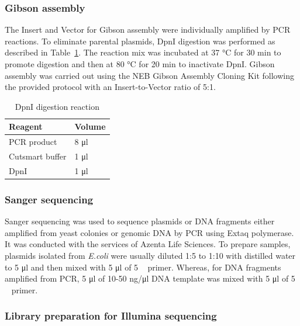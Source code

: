 \subsubsection{Gibson assembly}

The Insert and Vector for Gibson assembly were individually amplified by PCR reactions. To eliminate parental plasmids, DpnI digestion was performed as described in Table~\ref{tab:DpnI}. The reaction mix was incubated at 37 \si{\celsius} for 30 \si{\minute} to promote digestion and then at 80 \si{\celsius} for 20 \si{\minute} to inactivate DpnI. Gibson assembly was carried out using the NEB Gibson Assembly Cloning Kit following the provided protocol with an Insert-to-Vector ratio of 5:1. 

\begin{table}[htbp]
\centering
\caption{DpnI digestion reaction}
\label{tab:DpnI}
\begin{tabular}{ll}
\hline
\textbf{Reagent}        & \textbf{Volume} \\ \hline
PCR product            &  8 \si{\micro\litre}            \\
Cutsmart buffer   & 1 \si{\micro\litre}            \\
DpnI            & 1 \si{\micro\litre}            \\
\end{tabular}
\end{table}

\subsubsection{Sanger sequencing}

Sanger sequencing was used to sequence plasmids or DNA fragments either amplified from yeast colonies or genomic DNA by PCR using Extaq polymerase. It was conducted with the services of Azenta Life Sciences. To prepare samples, 
plasmids isolated from \textit{E.coli} were usually diluted 1:5 to 1:10 with distilled water to 5 \si{\micro\litre} and then mixed with 5 \si{\micro\litre} of 5 \si{\micro\Molar} primer. Whereas, for DNA fragments amplified from PCR, 5 \si{\micro\litre} of 10-50 \si{\nano\gram/\micro\litre} DNA template was mixed with 5 \si{\micro\litre} of 5 \si{\micro\Molar} primer. 

\subsubsection{Library preparation for Illumina sequencing}

